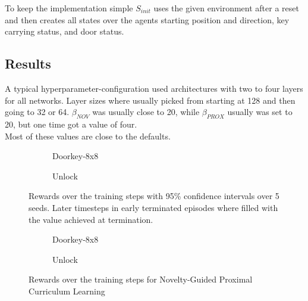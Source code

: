 \documentclass{article}
\begin{document}
To keep the implementation simple $S_{init}$ uses the given environment after a reset and then creates all states over the agents starting position and direction, key carrying status, and door status.

\subsection{Results}
\label{sec:results}

A typical hyperparameter-configuration used architectures with two to four layers for all networks. Layer sizes where usually picked from starting at 128 and then going to 32 or 64. $\beta_{NOV}$ was usually close to 20, while $\beta_{PROX}$ usually was set to 20, but one time got a value of four. \\
Most of these values are close to the defaults.


\begin{figure}[ht]
  \begin{subfigure}{0.49\textwidth}
    
    \caption{Doorkey-8x8}
    \label{fig:all:doorkey8}
  \end{subfigure}
  \begin{subfigure}{0.49\textwidth}
    
    \caption{Unlock}
    \label{fig:all:unlock}
  \end{subfigure}
  \caption{Rewards over the training steps with 95\% confidence intervals over 5 seeds. Later timesteps in early terminated episodes where filled with the value achieved at termination.}
  \label{fig:all}
\end{figure}

\begin{figure}[ht]
  \begin{subfigure}{0.49\textwidth}
    
    \caption{Doorkey-8x8}
    \label{fig:comb:doorkey8}
  \end{subfigure}
  \begin{subfigure}{0.49\textwidth}
    
    \caption{Unlock}
    \label{fig:comb:unlock}
  \end{subfigure}
  \caption{Rewards over the training steps for Novelty-Guided Proximal Curriculum Learning}
  \label{fig:comb}
\end{figure}
\end{document}
